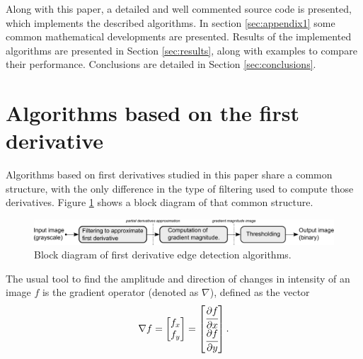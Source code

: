 \documentclass{ipol}
\numberwithin{equation}{section}
\numberwithin{table}{section}
\begin{document}
Along with this paper, a detailed and well commented source code is presented, which 
implements the described algorithms. In section \ref{sec:appendix1} some common mathematical developments are presented. 
Results of the implemented algorithms are presented in Section \ref{sec:results}, along with examples 
to compare their performance. Conclusions are detailed in Section \ref{sec:conclusions}.

\nocite{IPOL}


\section{Algorithms based on the first derivative}
\label{sec:first}

Algorithms based on first derivatives studied in this paper share a common structure, with the only difference  in the type of filtering used to compute those derivatives. Figure \ref{fig:blockdiagram1} shows a block diagram of that common structure. \\

\begin{figure}[!h]
	\centering
	\includegraphics[width=\textwidth]{blockdiagram1.pdf}
	\caption{Block diagram of first derivative edge detection algorithms.}
	\label{fig:blockdiagram1}
\end{figure}

The usual tool to find the amplitude and direction of changes in 
intensity of an image $f$ is the gradient operator (denoted as $\nabla$), defined 
as the vector
\begin{equation}
	\nabla f = 
				\begin{bmatrix} 
					f_x \\ f_y
				\end{bmatrix}
	=				
				\begin{bmatrix} 
					\cfrac{\partial f}{\partial x} \\ \cfrac{\partial f}{\partial y} \\
				\end{bmatrix}.
\end{equation}
\end{document}
